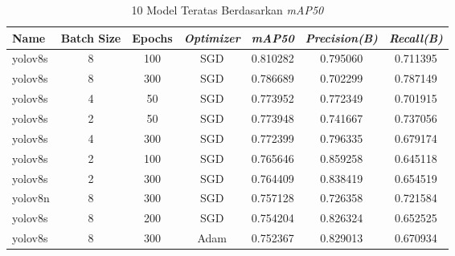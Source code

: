 \begin{table}[h!]
	\centering
	\caption{10 Model Teratas Berdasarkan \textit{mAP50}}
	\begin{tabular}{|l|c|c|c|c|c|c|}
		\hline
		\textbf{Name} & \textbf{Batch Size} & \textbf{Epochs} & \textbf{\textit{Optimizer}} & \textbf{\textit{mAP50}} & \textbf{\textit{Precision(B)}} & \textbf{\textit{Recall(B)}} \\
		\hline
		yolov8s       & 8                   & 100             & SGD                         & 0.810282                & 0.795060                       & 0.711395                    \\
		\hline
		yolov8s       & 8                   & 300             & SGD                         & 0.786689                & 0.702299                       & 0.787149                    \\
		\hline
		yolov8s       & 4                   & 50              & SGD                         & 0.773952                & 0.772349                       & 0.701915                    \\
		\hline
		yolov8s       & 2                   & 50              & SGD                         & 0.773948                & 0.741667                       & 0.737056                    \\
		\hline
		yolov8s       & 4                   & 300             & SGD                         & 0.772399                & 0.796335                       & 0.679174                    \\
		\hline
		yolov8s       & 2                   & 100             & SGD                         & 0.765646                & 0.859258                       & 0.645118                    \\
		\hline
		yolov8s       & 2                   & 300             & SGD                         & 0.764409                & 0.838419                       & 0.654519                    \\
		\hline
		yolov8n       & 8                   & 300             & SGD                         & 0.757128                & 0.726358                       & 0.721584                    \\
		\hline
		yolov8s       & 8                   & 200             & SGD                         & 0.754204                & 0.826324                       & 0.652525                    \\
		\hline
		yolov8s       & 8                   & 300             & Adam                        & 0.752367                & 0.829013                       & 0.670934                    \\
		\hline
	\end{tabular}

	\label{tab:model_teratas_map50}
\end{table}

